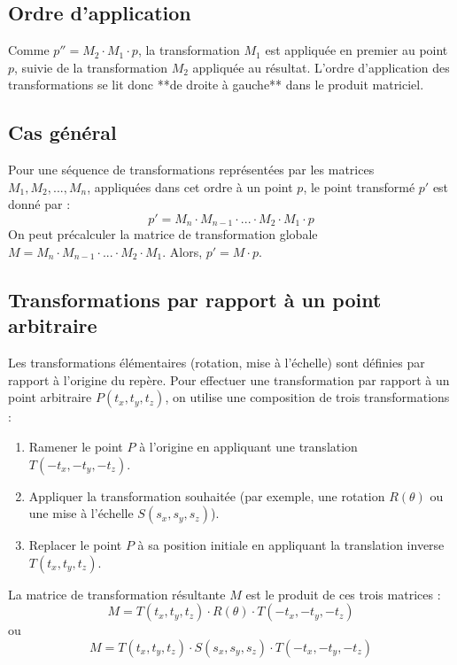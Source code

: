 \documentclass{article}
\begin{document}
\subsection{Ordre d'application}
Comme $p'' = M_2 \cdot M_1 \cdot p$, la transformation $M_1$ est appliquée en premier au point $p$, suivie de la transformation $M_2$ appliquée au résultat. L'ordre d'application des transformations se lit donc **de droite à gauche** dans le produit matriciel.

\subsection{Cas général}
Pour une séquence de transformations représentées par les matrices $M_1, M_2, ..., M_n$, appliquées dans cet ordre à un point $p$, le point transformé $p'$ est donné par :
\[ p' = M_n \cdot M_{n-1} \cdot ... \cdot M_2 \cdot M_1 \cdot p \]
On peut précalculer la matrice de transformation globale $M = M_n \cdot M_{n-1} \cdot ... \cdot M_2 \cdot M_1$. Alors, $p' = M \cdot p$.

\subsection{Transformations par rapport à un point arbitraire}
Les transformations élémentaires (rotation, mise à l'échelle) sont définies par rapport à l'origine du repère. Pour effectuer une transformation par rapport à un point arbitraire $P(t_x, t_y, t_z)$, on utilise une composition de trois transformations :
\begin{enumerate}
    \item Ramener le point $P$ à l'origine en appliquant une translation $T(-t_x, -t_y, -t_z)$.
    \item Appliquer la transformation souhaitée (par exemple, une rotation $R(\theta)$ ou une mise à l'échelle $S(s_x, s_y, s_z)$).
    \item Replacer le point $P$ à sa position initiale en appliquant la translation inverse $T(t_x, t_y, t_z)$.
\end{enumerate}
La matrice de transformation résultante $M$ est le produit de ces trois matrices :
\[ M = T(t_x, t_y, t_z) \cdot R(\theta) \cdot T(-t_x, -t_y, -t_z) \]
ou
\[ M = T(t_x, t_y, t_z) \cdot S(s_x, s_y, s_z) \cdot T(-t_x, -t_y, -t_z) \]
\end{document}
